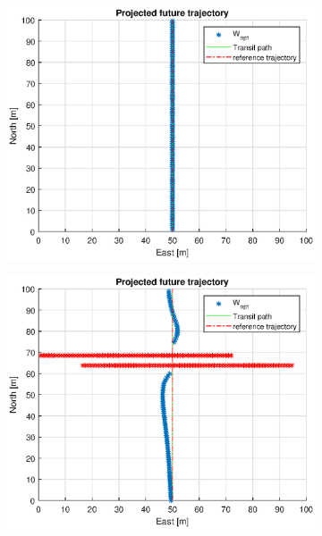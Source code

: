 \begin{figure} %
    \begin{subfigure}[b]{0.49\textwidth}
        \centering
        \includegraphics[width=\textwidth]{Images/Figures/Enkel_GW/Simple0_f999_Frame1}
    \end{subfigure}
    \hfill
    \begin{subfigure}[b]{0.499\textwidth}
        \centering
        \includegraphics[width=\textwidth]{Images/Figures/Enkel_GW/Simple0_f999_Frame2}

\end{subfigure}
\end{figure}
